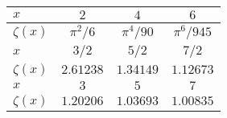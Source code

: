 \documentclass[11pt,letter, swedish, english, twocolumn
]{article}
\begin{document}
\begin{center}
\begin{tabular}{|l||c|c|c|}\hline
$x$ & $2$ & $4$ & $6$
\\ \hline $\zeta(x)$ & 
$\pi^2/6$ & $\pi^4/90$ & $\pi^6/945$ 
\\ \hline\hline
$x$ & $3/2$ & $5/2$ & $7/2$
\\ \hline $\zeta(x)$ & 
$2.61238$ & $1.34149$ & $1.12673$ 
\\ \hline\hline
$x$ & $3$ & $5$ & $7$
\\ \hline$\zeta(x)$ & 
$1.20206$ & $1.03693$ & $1.00835$ 
\\ \hline
\end{tabular}
\end{center}
\end{document}
